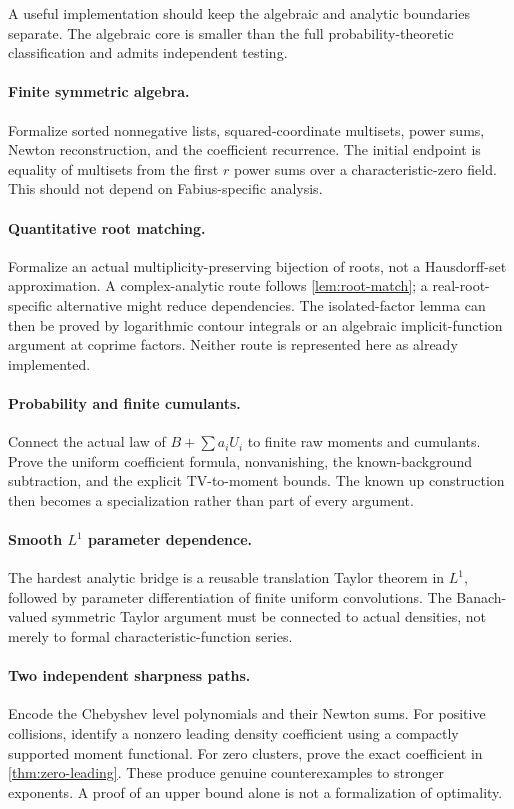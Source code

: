 \documentclass[11pt,a4paper]{article}
\numberwithin{equation}{section}
\theoremstyle{definition}
\theoremstyle{remark}
\begin{document}
A useful implementation should keep the algebraic and analytic boundaries
separate.  The algebraic core is smaller than the full probability-theoretic
classification and admits independent testing.

\paragraph{Finite symmetric algebra.}
Formalize sorted nonnegative lists, squared-coordinate multisets, power sums,
Newton reconstruction, and the coefficient recurrence.  The initial endpoint
is equality of multisets from the first $r$ power sums over a characteristic-zero
field.  This should not depend on Fabius-specific analysis.

\paragraph{Quantitative root matching.}
Formalize an actual multiplicity-preserving bijection of roots, not a
Hausdorff-set approximation.  A complex-analytic route follows
\cref{lem:root-match}; a real-root-specific alternative might reduce dependencies.
The isolated-factor lemma can then be proved by logarithmic contour integrals
or an algebraic implicit-function argument at coprime factors.  Neither route
is represented here as already implemented.

\paragraph{Probability and finite cumulants.}
Connect the actual law of $B+\sum a_iU_i$ to finite raw moments and cumulants.
Prove the uniform coefficient formula, nonvanishing, the known-background
subtraction, and the explicit TV-to-moment bounds.  The known up construction
then becomes a specialization rather than part of every argument.

\paragraph{Smooth \texorpdfstring{$L^1$}{L1} parameter dependence.}
The hardest analytic bridge is a reusable translation Taylor theorem in $L^1$,
followed by parameter differentiation of finite uniform convolutions.  The
Banach-valued symmetric Taylor argument must be connected to actual densities,
not merely to formal characteristic-function series.

\paragraph{Two independent sharpness paths.}
Encode the Chebyshev level polynomials and their Newton sums.  For positive
collisions, identify a nonzero leading density coefficient using a compactly
supported moment functional.  For zero clusters, prove the exact coefficient
in \cref{thm:zero-leading}.  These produce genuine counterexamples to stronger
exponents.  A proof of an upper bound alone is not a formalization of optimality.
\end{document}
